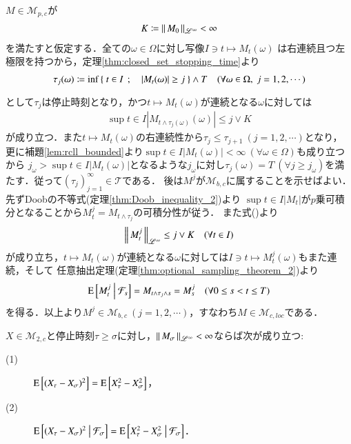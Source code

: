 	\begin{prf}
		$M \in \mathcal{M}_{p,c}$が
		\begin{align}
			K \coloneqq \left\|\, M_0\, \right\|_{\mathscr{L}^\infty} < \infty
		\end{align}
		を満たすと仮定する．全ての$\omega \in \Omega$に対し写像$I \ni t \longmapsto M_t(\omega)$
		は右連続且つ左極限を持つから，定理\ref{thm:closed_set_stopping_time}より
		\begin{align}
			\tau_j(\omega) \coloneqq \operatorname*{inf}_{} \left\{\ t \in I\ \, ; \quad |M_t(\omega)| \geq j\ \right\} \wedge T \quad (\forall \omega \in \Omega,\ j=1,2,\cdots)
		\end{align}
		として$\tau_j$は停止時刻となり，かつ$t \longmapsto M_t(\omega)$が連続となる$\omega$に対しては
		\begin{align}
			\sup{t \in I}{\left| M_{t \wedge \tau_j(\omega)}(\omega) \right|} \leq j \vee K
			\label{eq:M_pc_M_cloc}
		\end{align}
		が成り立つ．また$t \longmapsto M_t(\omega)$の右連続性から$\tau_j \leq \tau_{j+1}\ (j=1,2,\cdots)$となり，
		更に補題\ref{lem:rcll_bounded}より$\sup{t \in I}{|M_t(\omega)|} < \infty\ (\forall \omega \in \Omega)$も成り立つから
		$j_\omega > \sup{t \in I}{|M_t(\omega)|}$となるような$j_\omega$に対し$\tau_j(\omega) = T\ (\forall j \geq j_\omega)$を満たす．従って$(\tau_j)_{j=1}^{\infty} \in \mathcal{T}$である．
		後は$M^j$が$\mathcal{M}_{b,c}$に属することを示せばよい．先ずDoobの不等式(定理\ref{thm:Doob_inequality_2})より
		$\sup{t \in I}{|M_t|}$が$p$乗可積分となることから$M_t^j = M_{t \wedge \tau_j}$の可積分性が従う．
		また式()より
		\begin{align}
			\left\|\, M_t^j\, \right\|_{\mathscr{L}^\infty} \leq j \vee K \quad (\forall t \in I)
		\end{align}
		が成り立ち，$t \longmapsto M_t(\omega)$が連続となる$\omega$に対しては$I \ni t \longmapsto M_t^j(\omega)$もまた連続，そして
		任意抽出定理(定理\ref{thm:optional_sampling_theorem_2})より
		\begin{align}
			\operatorname{E} \left[ M_t^j \ \middle|\ \mathcal{F}_s \right] = M_{t \wedge \tau_j \wedge s} = M_s^j \quad (\forall 0 \leq s < t \leq T)
		\end{align}
		を得る．以上より$M^j \in \mathcal{M}_{b,c}\ (j=1,2,\cdots)$，すなわち$M \in \mathcal{M}_{c,loc}$である．
		\QED
	\end{prf}
	
	\begin{itembox}[l]{}
		\begin{lem}
			$X \in \mathcal{M}_{2,c}$と停止時刻$\tau \geq \sigma$に対し，$\left\|\, M_\sigma\, \right\|_{\mathscr{L}^\infty} < \infty$ならば次が成り立つ:
			\begin{description}
				\item[(1)] $\operatorname{E} \left[ (X_{\tau} - X_{\sigma})^2 \right] = \operatorname{E} \left[ X_{\tau}^2 - X_{\sigma}^2 \right]$，
				\item[(2)] $\operatorname{E} \left[ (X_{\tau} - X_{\sigma})^2 \ \middle|\ \mathcal{F}_\sigma \right] = \operatorname{E} \left[ X_{\tau}^2 - X_{\sigma}^2 \ \middle|\ \mathcal{F}_\sigma \right]$．
			\end{description}
			\label{lem:stopping_time_telescopic_sum}
		\end{lem}
	\end{itembox}
	
